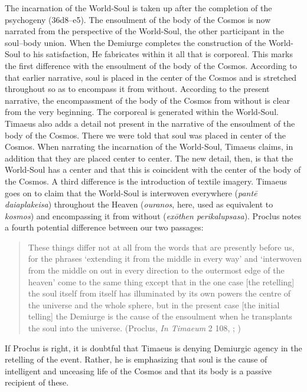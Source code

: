 The incarnation of the World-Soul is taken up after the completion of the psychogeny (36d8–e5). The ensoulment of the body of the Cosmos is now narrated from the perspective of the World-Soul, the other participant in the soul--body union. When the Demiurge completes the construction of the World-Soul to his satisfaction, He fabricates within it all that is corporeal. This marks the first difference with the ensoulment of the body of the Cosmos. According to that earlier narrative, soul is placed in the center of the Cosmos and is stretched throughout so as to encompass it from without. According to the present narrative, the encompassment of the body of the Cosmos from without is clear from the very beginning. The corporeal is generated within the World-Soul. Timaeus also adds a detail not present in the narrative of the ensoulment of the body of the Cosmos. There we were told that soul was placed in center of the Cosmos. When narrating the incarnation of the World-Soul, Timaeus claims, in addition that they are placed center to center. The new detail, then, is that the World-Soul has a center and that this is coincident with the center of the body of the Cosmos. A third difference is the introduction of textile imagery. Timaeus goes on to claim that the World-Soul is interwoven everywhere (\emph{pantē daiaplakeisa}) throughout the Heaven (\emph{ouranos}, here, used as equivalent to \emph{kosmos}) and encompassing it from without (\emph{exōthen perikalupsasa}). Proclus notes a fourth potential difference between our two passages:
\begin{quote}
	These things differ not at all from the words that are presently before us, for the phrases `extending it from the middle in every way' and `interwoven from the middle on out in every direction to the outermost edge of the heaven' come to the same thing except that in the one case [the retelling] the soul itself from itself has illuminated by its own powers the centre of the universe and the whole sphere, but in the present case [the initial telling] the Demiurge is the cause of the ensoulment when he transplants the soul into the universe. (Proclus, \emph{In Timaeum} 2 108, \citealt{Diehl:1903re}; \citealt[64]{Baltzly:2009bc})
\end{quote}
If Proclus is right, it is doubtful that Timaeus is denying Demiurgic agency in the retelling of the event. Rather, he is emphasizing that soul is the cause of intelligent and unceasing life of the Cosmos and that its body is a passive recipient of these.


